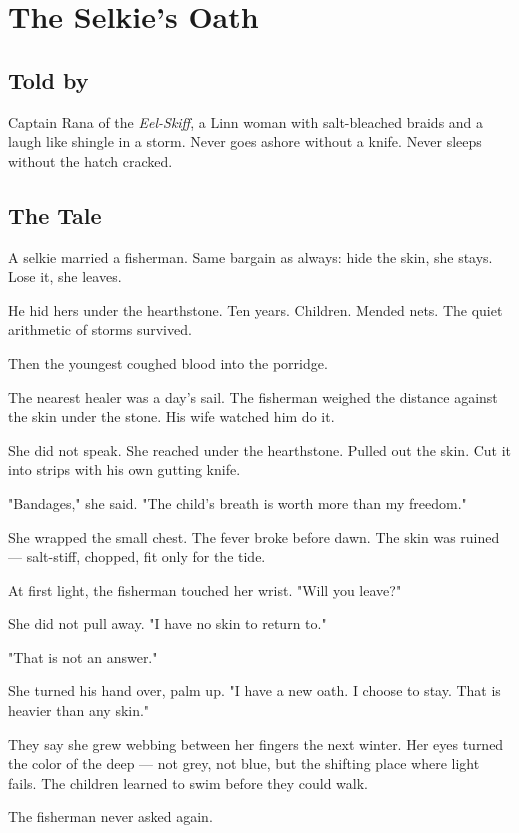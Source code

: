 \chapter{The Selkie's Oath}

\section*{Told by}
Captain Rana of the \textit{Eel-Skiff}, a Linn woman with salt-bleached braids and a laugh like shingle in a storm. Never goes ashore without a knife. Never sleeps without the hatch cracked.

\section*{The Tale}

A selkie married a fisherman. Same bargain as always: hide the skin, she stays. Lose it, she leaves.

He hid hers under the hearthstone. Ten years. Children. Mended nets. The quiet arithmetic of storms survived.

Then the youngest coughed blood into the porridge.

The nearest healer was a day's sail. The fisherman weighed the distance against the skin under the stone. His wife watched him do it.

She did not speak. She reached under the hearthstone. Pulled out the skin. Cut it into strips with his own gutting knife.

"Bandages," she said. "The child's breath is worth more than my freedom."

She wrapped the small chest. The fever broke before dawn. The skin was ruined — salt-stiff, chopped, fit only for the tide.

At first light, the fisherman touched her wrist. "Will you leave?"

She did not pull away. "I have no skin to return to."

"That is not an answer."

She turned his hand over, palm up. "I have a new oath. I choose to stay. That is heavier than any skin."

They say she grew webbing between her fingers the next winter. Her eyes turned the color of the deep — not grey, not blue, but the shifting place where light fails. The children learned to swim before they could walk.

The fisherman never asked again.


